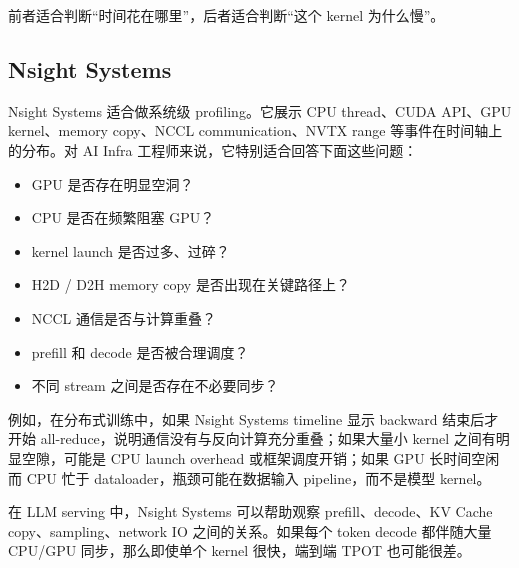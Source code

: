 前者适合判断“时间花在哪里”，后者适合判断“这个 kernel 为什么慢”。

\subsection{Nsight Systems}
\label{subsec:nsight-systems}

Nsight Systems 适合做系统级 profiling。它展示 CPU thread、CUDA API、GPU kernel、memory copy、NCCL communication、NVTX range 等事件在时间轴上的分布。对 AI Infra 工程师来说，它特别适合回答下面这些问题：

\begin{itemize}
  \item GPU 是否存在明显空洞？
  \item CPU 是否在频繁阻塞 GPU？
  \item kernel launch 是否过多、过碎？
  \item H2D / D2H memory copy 是否出现在关键路径上？
  \item NCCL 通信是否与计算重叠？
  \item prefill 和 decode 是否被合理调度？
  \item 不同 stream 之间是否存在不必要同步？
\end{itemize}

例如，在分布式训练中，如果 Nsight Systems timeline 显示 backward 结束后才开始 all-reduce，说明通信没有与反向计算充分重叠；如果大量小 kernel 之间有明显空隙，可能是 CPU launch overhead 或框架调度开销；如果 GPU 长时间空闲而 CPU 忙于 dataloader，瓶颈可能在数据输入 pipeline，而不是模型 kernel。

在 LLM serving 中，Nsight Systems 可以帮助观察 prefill、decode、KV Cache copy、sampling、network IO 之间的关系。如果每个 token decode 都伴随大量 CPU/GPU 同步，那么即使单个 kernel 很快，端到端 TPOT 也可能很差。

